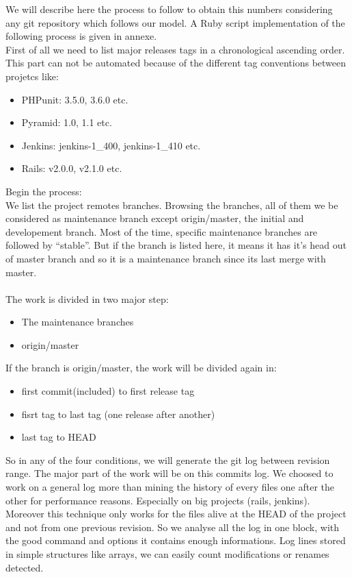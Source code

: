 We will describe here the process to follow to obtain this numbers considering any git repository which follows our model. A Ruby script implementation of the following process is given in annexe.\\
First of all we need to list major releases tags in a chronological ascending order. This part can not be automated because of the different tag conventions between projetcs like:
\begin{itemize}
\item PHPunit: 3.5.0, 3.6.0 etc. 
\item Pyramid: 1.0, 1.1 etc.
\item Jenkins: jenkins-1\_400,  jenkins-1\_410 etc.
\item Rails: v2.0.0, v2.1.0 etc. 
\end{itemize}
\medskip
Begin the process:\\
We list the project remotes branches. Browsing the branches, all of them we be considered as maintenance branch except origin/master, the initial and developement branch. Most of the time, specific maintenance branches are followed by “stable”. But if the branch is listed here, it means it has it’s head out of master branch and so it is a maintenance branch since its last merge with master.\\\\
The work is divided in two major step:
\begin{itemize}
\item The maintenance branches
\item origin/master
\end{itemize}
\medskip
If the branch is origin/master, the work will be divided again in:
\begin{itemize}
\item first commit(included) to first release tag
\item fisrt tag to last tag (one release after another)
\item last tag to HEAD
\end{itemize}
\medskip
So in any of the four conditions, we will generate the git log between revision range.
The major part of the work will be on this commits log. We choosed to work on a general log more than mining the history of every files one after the other for performance reasons. Especially on big projects (rails, jenkins). Moreover this technique only works for the files alive at the HEAD of the project and not from one previous revision. So we analyse all the log in one block, with the good command and options it contains enough informations. Log lines stored in simple structures like arrays, we can easily count modifications or renames detected.\\
